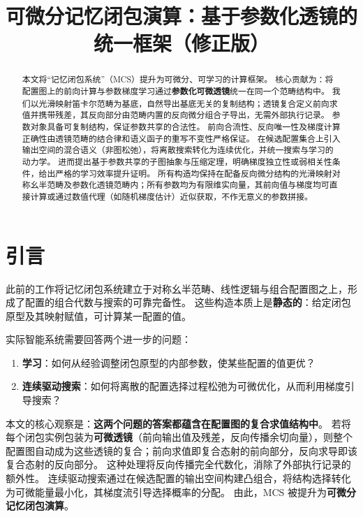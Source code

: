 \documentclass{ctexart}
\begin{document}
\title{可微分记忆闭包演算：基于参数化透镜的统一框架（修正版）}
\author{}
\date{}
\maketitle

\begin{abstract}
本文将“记忆闭包系统”（MCS）提升为可微分、可学习的计算框架。  
核心贡献为：将配置图上的前向计算与参数梯度学习通过\textbf{参数化可微透镜}统一在同一个范畴结构中。  
我们以光滑映射笛卡尔范畴为基底，自然导出基底无关的复制结构；透镜复合定义前向求值并携带残差，其反向部分由范畴内置的反向微分组合子导出，无需外部执行记录。  
参数对象具备可复制结构，保证参数共享的合法性。  
前向合流性、反向唯一性及梯度计算正确性由透镜范畴的结合律和语义函子的重写不变性严格保证。  
在候选配置集合上引入输出空间的混合语义（非图松弛），将离散搜索转化为连续优化，并统一搜索与学习的动力学。  
进而提出基于参数共享的子图抽象与压缩定理，明确梯度独立性或弱相关性条件，给出严格的学习效率提升证明。  
所有构造均保持在配备反向微分结构的光滑映射对称幺半范畴及参数化透镜范畴内；所有参数均为有限维实向量，其前向值与梯度均可直接计算或通过数值代理（如随机梯度估计）近似获取，不作无意义的参数拼接。
\end{abstract}

\section{引言}

此前的工作将记忆闭包系统建立于对称幺半范畴、线性逻辑与组合配置图之上，形成了配置的组合代数与搜索的可靠完备性。  
这些构造本质上是\textbf{静态的}：给定闭包原型及其映射赋值，可计算某一配置的值。

实际智能系统需要回答两个进一步的问题：
\begin{enumerate}
    \item \textbf{学习}：如何从经验调整闭包原型的内部参数，使某些配置的值更优？
    \item \textbf{连续驱动搜索}：如何将离散的配置选择过程松弛为可微优化，从而利用梯度引导搜索？
\end{enumerate}

本文的核心观察是：\textbf{这两个问题的答案都蕴含在配置图的复合求值结构中}。  
若将每个闭包实例包装为\textbf{可微透镜}（前向输出值及残差，反向传播余切向量），则整个配置图自动成为这些透镜的复合；前向求值即复合态射的前向部分，反向求导即该复合态射的反向部分。  
这种处理将反向传播完全代数化，消除了外部执行记录的额外性。  
连续驱动搜索通过在候选配置的输出空间构建凸组合，将结构选择转化为可微能量最小化，其梯度流引导选择概率的分配。  
由此，MCS 被提升为\textbf{可微分记忆闭包演算}。
\end{document}
